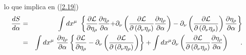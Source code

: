 \begin{solution}
lo que implica en (\ref{2.19})%
\begin{eqnarray}
\frac{dS}{d\alpha } &=&\int dx^{\mu }\ \left\{ \frac{\partial \mathcal{L}}{%
\partial \eta _{\rho }}\frac{\partial \eta _{\rho }}{\partial \alpha }%
\mathcal{+}\partial _{\nu }\left( \frac{\partial \mathcal{L}}{\partial
\left( \partial _{\nu }\eta _{\rho }\right) }\frac{\partial \eta _{\rho }}{%
\partial \alpha }\right) -\partial _{\nu }\left( \frac{\partial \mathcal{L}}{%
\partial \left( \partial _{\nu }\eta _{\rho }\right) }\right) \frac{\partial
\eta _{\rho }}{\partial \alpha }\right\}  \notag \\
&=&\int dx^{\mu }\ \frac{\partial \eta _{\rho }}{\partial \alpha }\left\{ 
\frac{\partial \mathcal{L}}{\partial \eta _{\rho }}-\partial _{\nu }\left( 
\frac{\partial \mathcal{L}}{\partial \left( \partial _{\nu }\eta _{\rho
}\right) }\right) \right\} +\int dx^{\mu }\partial _{\nu }\left( \frac{%
\partial \mathcal{L}}{\partial \left( \partial _{\nu }\eta _{\rho }\right) }%
\frac{\partial \eta _{\rho }}{\partial \alpha }\right) ~~~~~.  \label{2.20}
\end{eqnarray}
\end{solution}
